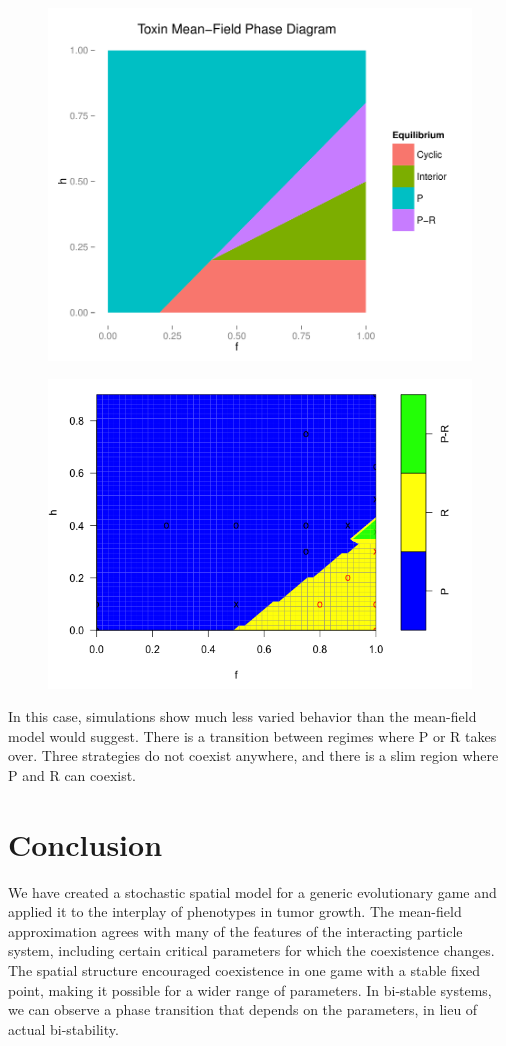 \documentclass[12pt]{report}
\begin{document}
\begin{figure}
\centering
\includegraphics[width = 0.8 \linewidth]{Diagrams/toxin_phase-mf_e-0_2_g-0_4}
\end{figure}

\begin{figure}
\centering
\includegraphics[width = 0.8 \linewidth]{Diagrams/tm2_phase}
\end{figure}


In this case, simulations show much less varied behavior than the mean-field model would suggest. There is a transition between regimes where P or R takes over. Three strategies do not coexist anywhere, and there is a slim region where P and R can coexist.


\chapter*{Conclusion}
We have created a stochastic spatial model for a generic evolutionary game and applied it to the interplay of phenotypes in tumor growth. The mean-field approximation agrees with many of the features of the interacting particle system, including certain critical parameters for which the coexistence changes. The spatial structure encouraged coexistence in one game with a stable fixed point, making it possible for a wider range of parameters. In bi-stable systems, we can observe a phase transition that depends on the parameters, in lieu of actual bi-stability.  \\
\end{document}
